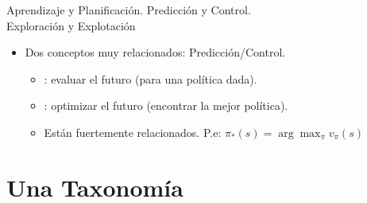 \documentclass[10pt, envcountsect, handout, aspectratio=1610, hyperref={hypertexnames=true}]{beamer}
\begin{document}
\begin{frame}{Aprendizaje y Planificación. Predicción y Control.\\ Exploración y Explotación}
\begin{itemize}
    
    
\item Dos conceptos muy relacionados: Predicción/Control.
	\begin{itemize}
        \item {}: evaluar el futuro (para una política dada).
        \item {}: optimizar el futuro (encontrar la mejor política).
        \item {Están fuertemente relacionados}. P.e:
        \(
        \pi_*(s) = \arg\max_{\pi} v_{\pi}(s)
        \)
    \end{itemize}
    
\end{itemize}


\end{frame}





\section{Una Taxonomía}

\end{document}
